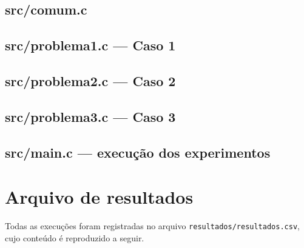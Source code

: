 \documentclass[11pt,a4paper]{article}
\begin{document}
\subsection*{src/comum.c}

\subsection*{src/problema1.c --- Caso 1}

\subsection*{src/problema2.c --- Caso 2}

\subsection*{src/problema3.c --- Caso 3}

\subsection*{src/main.c --- execução dos experimentos}


\section{Arquivo de resultados}

Todas as execuções foram registradas no arquivo \texttt{resultados/resultados.csv}, cujo conteúdo é reproduzido a seguir.


\end{document}
